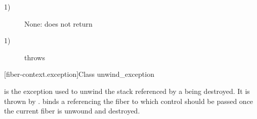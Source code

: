 \begin{description}
    \item[1)] None: \unwindfib does not return
\end{description}

\begin{description}
    \item[1)] throws \unwindex
\end{description}


[fiber-context.exception]{Class unwind\_exception}

is the exception used to unwind the stack referenced by a \fiber being destroyed.
It is thrown by \unwindfib. \unwindex binds a \fiber referencing the fiber to
which control should be passed once the current fiber is unwound and destroyed.

